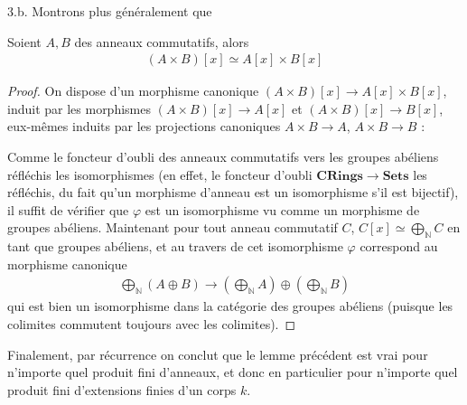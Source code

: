 \documentclass[11pt]{article}
\begin{document}
    \begin{question}{3.b.}
        Montrons plus généralement que
        \begin{lemm}
            Soient $A,B$ des anneaux commutatifs, alors
            \begin{align*}
                (A \times B)[x] \simeq A[x] \times B[x]
            \end{align*}
        \end{lemm}
        \begin{proof}
            On dispose d'un morphisme canonique $(A \times B)[x] \to A[x] \times B[x]$, induit par les morphismes $(A \times B)[x] \to A[x]$ et $(A \times B)[x] \to B[x]$, eux-mêmes induits par les projections canoniques $A \times B \to A$, $A \times B \to B$ :
            \begin{figure}[H]
                \centering
            \end{figure}
            Comme le foncteur d'oubli des anneaux commutatifs vers les groupes abéliens réfléchis les isomorphismes (en effet, le foncteur d'oubli $\mathbf{CRings} \to \mathbf{Sets}$ les réfléchis, du fait qu'un morphisme d'anneau est un isomorphisme s'il est bijectif), il suffit de vérifier que $\varphi$ est un isomorphisme vu comme un morphisme de groupes abéliens. Maintenant pour tout anneau commutatif $C$, $C[x] \simeq \bigoplus_{\mathbb{N}} C$ en tant que groupes abéliens, et au travers de cet isomorphisme $\varphi$ correspond au morphisme canonique
            \begin{align*}
                \bigoplus_{\mathbb{N}} (A \oplus B) \to \left(\bigoplus_{\mathbb{N}} A\right) \oplus \left(\bigoplus_{\mathbb{N}} B\right)
            \end{align*}
            qui est bien un isomorphisme dans la catégorie des groupes abéliens (puisque les colimites commutent toujours avec les colimites).
        \end{proof}
        Finalement, par récurrence on conclut que le lemme précédent est vrai pour n'importe quel produit fini d'anneaux, et donc en particulier pour n'importe quel produit fini d'extensions finies d'un corps $k$.
    \end{question}
\end{document}
